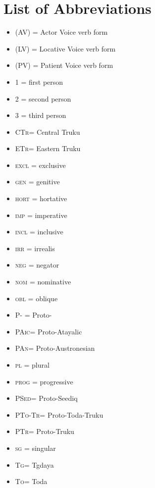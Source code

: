\documentclass[12pt]{article}
\newcommand{\pan}{\textsc{PAn}\xspace}
\newcommand{\paic}{\textsc{PAic}\xspace}
\newcommand{\psed}{\textsc{PSed}\xspace}
\newcommand{\psedf}{Proto-Seediq\xspace}
\newcommand{\stg}{\textsc{Tg}\xspace}
\newcommand{\stgf}{Tgdaya\xspace}
\newcommand{\ptotr}{\textsc{PTo-Tr}\xspace}
\newcommand{\ptotrf}{Proto-Toda-Truku\xspace}
\newcommand{\sto}{\textsc{To}\xspace}
\newcommand{\stof}{Toda\xspace}
\newcommand{\ptr}{\textsc{PTr}\xspace}
\newcommand{\ptrf}{Proto-Truku\xspace}
\newcommand{\sctr}{\textsc{CTr}\xspace}
\newcommand{\sctrf}{Central Truku\xspace}
\newcommand{\setr}{\textsc{ETr}\xspace}
\newcommand{\setrf}{Eastern Truku\xspace}
\begin{document}
\newpage
{}
\section*{List of Abbreviations}

    \begin{multicols}{2} 
    \begin{itemize}[leftmargin=*]

    \setlength\itemsep{-.5em}
    \item[ ] (AV) = Actor Voice verb form
    \item[ ] (LV) = Locative Voice verb form
    \item[ ] (PV) = Patient Voice verb form
    \item[ ] 1 = first person
    \item[ ] 2 = second person
    \item[ ] 3 = third person
    \item[ ] \sctr = \sctrf
    \item[ ] \setr = \setrf
    \item[ ] \textsc{excl} = exclusive
    \item[ ] \textsc{gen} = genitive
    \item[ ] \textsc{hort} = hortative
    \item[ ] \textsc{imp} = imperative
    \item[ ] \textsc{incl} = inclusive
    \item[ ] \textsc{irr} = irrealis
    \item[ ] \textsc{neg} = negator 
    \item[ ] \textsc{nom} = nominative
    \item[ ] \textsc{obl} = oblique
    \item[ ] P- = Proto-
    \item[ ] \paic = Proto-Atayalic
    \item[ ] \pan = Proto-Austronesian
    \item[ ] \textsc{pl} = plural
    \item[ ] \textsc{prog} = progressive
    \item[ ] \psed = \psedf
    \item[ ] \ptotr = \ptotrf
    \item[ ] \ptr = \ptrf
    \item[ ] \textsc{sg} = singular
    \item[ ] \stg = \stgf
    \item[ ] \sto = \stof

    \end{itemize}
    \end{multicols}
\end{document}
